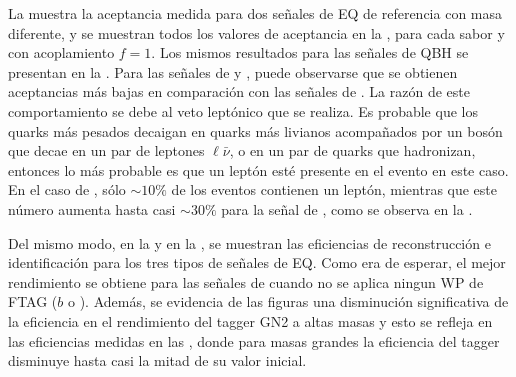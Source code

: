 La \Tab{\ref{tab:signals:acc_eff:acceptances}} muestra la aceptancia medida para dos señales de \ac{EQ} de referencia con masa diferente, y se muestran todos los valores de aceptancia en la \Fig{\ref{fig:signals:acc_eff:acceptances:qstar}}, para cada sabor y con acoplamiento \(f=1\). Los mismos resultados para las señales de \ac{QBH} se presentan en la \Fig{\ref{fig:signals:acc_eff:acceptances:qbh}}.
Para las señales de \cstar y \bstar, puede observarse que se obtienen aceptancias más bajas en comparación con las señales de \qstar. La razón de este comportamiento se debe al veto leptónico que se realiza. Es probable que los quarks más pesados decaigan en quarks más livianos acompañados por un bosón \Wboson que decae en un par de leptones \(\ell \bar{\nu}\), o en un par de quarks que hadronizan, entonces lo más probable es que un leptón esté presente en el evento en este caso. En el caso de \qstar, sólo \(\sim 10\%\) de los eventos contienen un leptón, mientras que este número aumenta hasta casi \(\sim 30\%\) para la señal de \bstar, como se observa en la \Tab{\ref{tab:signals:acc_eff:acceptances}}.

Del mismo modo, en la \Fig{\ref{fig:signals:acc_eff:efficiencies}} y en la \Tab{\ref{tab:signals:acc_eff:efficiencies}}, se muestran las eficiencias de reconstrucción e identificación para los tres tipos de señales de \ac{EQ}. Como era de esperar, el mejor rendimiento se obtiene para las señales de \qstar cuando no se aplica ningun \ac{WP} de \ac{FTAG} (\(b\) o \ctagging). Además, se evidencia de las figuras una disminución significativa de la eficiencia en el rendimiento del tagger GN2 a altas masas y esto se refleja en las eficiencias medidas en las \Figs{\ref{fig:signals:acc_eff:efficiencies:cstar}}{\ref{fig:signals:acc_eff:efficiencies:bstar}}, donde para masas grandes la eficiencia del tagger disminuye hasta casi la mitad de su valor inicial.

